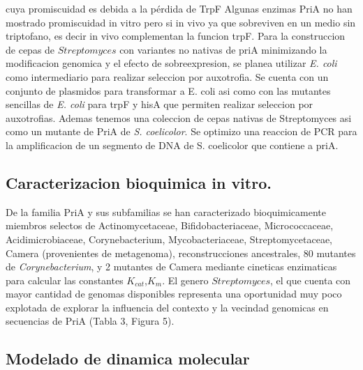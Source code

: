 \documentclass[12pt,twoside]{reedthesis}
\begin{document}
  cuya promiscuidad es debida a la pérdida de TrpF Algunas enzimas PriA no
  han mostrado promiscuidad in vitro pero si in vivo ya que sobreviven en
  un medio sin triptofano, es decir in vivo complementan la funcion trpF.
  Para la construccion de cepas de \(Streptomyces\) con variantes no
  nativas de priA minimizando la modificacion genomica y el efecto de
  sobreexpresion, se planea utilizar \emph{E. coli} como intermediario
  para realizar seleccion por auxotrofia. Se cuenta con un conjunto de
  plasmidos para transformar a E. coli asi como con las mutantes sencillas
  de \emph{E. coli} para trpF y hisA que permiten realizar seleccion por
  auxotrofias. Ademas tenemos una coleccion de cepas nativas de
  Streptomyces asi como un mutante de PriA de \emph{S. coelicolor}. Se
  optimizo una reaccion de PCR para la amplificacion de un segmento de DNA
  de S. coelicolor que contiene a priA.
  
  \subsection{Caracterizacion bioquimica in
  vitro.}\label{caracterizacion-bioquimica-in-vitro.}
  
  De la familia PriA y sus subfamilias se han caracterizado
  bioquimicamente miembros selectos de Actinomycetaceae,
  Bifidobacteriaceae, Micrococcaceae, Acidimicrobiaceae, Corynebacterium,
  Mycobacteriaceae, Streptomycetaceae, Camera (provenientes de
  metagenoma), reconstrucciones ancestrales, 80 mutantes de
  \emph{Corynebacterium}, y 2 mutantes de Camera mediante cineticas
  enzimaticas para calcular las constantes \(K_{cat}\),\(K_m\). El genero
  \(Streptomyces\), el que cuenta con mayor cantidad de genomas
  disponibles representa una oportunidad muy poco explotada de explorar la
  influencia del contexto y la vecindad genomicas en secuencias de PriA
  (Tabla 3, Figura 5).
  
  \subsection{Modelado de dinamica
  molecular}\label{modelado-de-dinamica-molecular}
  
\end{document}
